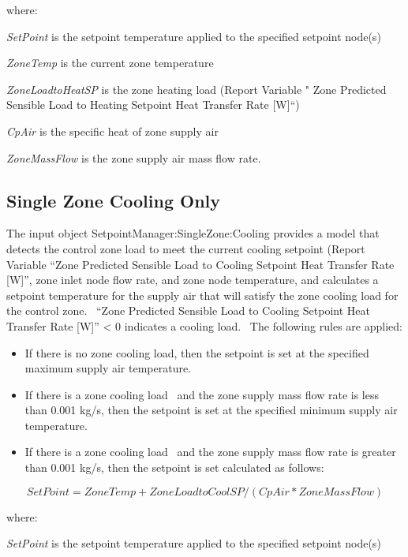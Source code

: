 where:

\emph{SetPoint} is the setpoint temperature applied to the specified setpoint node(s)

\emph{ZoneTemp} is the current zone temperature

\emph{ZoneLoadtoHeatSP} is the zone heating load (Report Variable " Zone Predicted Sensible Load to Heating Setpoint Heat Transfer Rate {[}W{]}``)

\emph{CpAir} is the specific heat of zone supply air

\emph{ZoneMassFlow} is the zone supply air mass flow rate.

\subsection{Single Zone Cooling Only}\label{single-zone-cooling-only}

The input object SetpointManager:SingleZone:Cooling provides a model that detects the control zone load to meet the current cooling setpoint (Report Variable ``Zone Predicted Sensible Load to Cooling Setpoint Heat Transfer Rate {[}W{]}'', zone inlet node flow rate, and zone node temperature, and calculates a setpoint temperature for the supply air that will satisfy the zone cooling load for the control zone.~ ``Zone Predicted Sensible Load to Cooling Setpoint Heat Transfer Rate {[}W{]}'' \textless{} 0 indicates a cooling load.~ The following rules are applied:

\begin{itemize}
\item If there is no zone cooling load, then the setpoint is set at the specified maximum supply air temperature.
\item If there is a zone cooling load~ and the zone supply mass flow rate is less than 0.001 kg/s, then the setpoint is set at the specified minimum supply air temperature.
\item If there is a zone cooling load~ and the zone supply mass flow rate is greater than 0.001 kg/s, then the setpoint is set calculated as follows:
\end{itemize}

\begin{equation}
SetPoint = ZoneTemp + ZoneLoadtoCoolSP/(CpAir*ZoneMassFlow)
\end{equation}

where:

\emph{SetPoint} is the setpoint temperature applied to the specified setpoint node(s)


